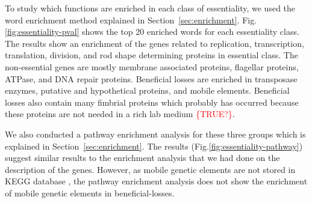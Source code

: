 \documentclass[12pt,letterpaper]{article}
\begin{document}
To study which functions are enriched in each class of essentiality, we used the word enrichment method explained in Section~\ref{sec:enrichment}. Fig.\@ \ref{fig:essentiality-pval} shows the top 20 enriched words for each essentiality class. The results show an enrichment of the genes related to replication, transcription, translation, division, and rod shape determining proteins in essential class. The non-essential genes are mostly membrane associated proteins, flagellar proteins, ATPase, and DNA repair proteins. Beneficial losses are enriched in transposase enzymes, putative and hypothetical proteins, and mobile elements. Beneficial losses also contain many fimbrial proteins which probably has occurred because these proteins are not needed in a rich lab medium \textcolor{red}{\{TRUE?\}}.

We also conducted a pathway enrichment analysis for these three groups which is explained in Section~\ref{sec:enrichment}. The results (Fig.\@ \ref{fig:essentiality-pathway}) suggest similar results to the enrichment analysis that we had done on the description of the genes. However, as mobile genetic elements are not stored in KEGG database \cite{kanehisa_kegg:_2000}, the pathway enrichment analysis does not show the enrichment of mobile genetic elements in beneficial-losses.
\end{document}
